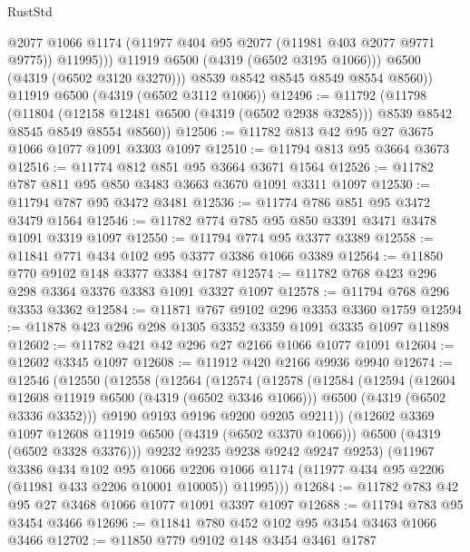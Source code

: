 \begin{lexlean}{RustStd}
\begin{coremodule}
                  @2077
                  @1066
                  @1174
                  (@11977 @404 @95 @2077 (@11981 @403 @2077 @9771 @9775))
                  @11995)))
            @11919
            @6500
            (@4319 (@6502 @3195 @1066)))
          @6500
          (@4319 (@6502 @3120 @3270)))
        @8539
        @8542
        @8545
        @8549
        @8554
        @8560))
    @11919
    @6500
    (@4319 (@6502 @3112 @1066))
@12496 := @11792
    (@11798
      (@11804
        (@12158 @12481 @6500 (@4319 (@6502 @2938 @3285)))
        @8539
        @8542
        @8545
        @8549
        @8554
        @8560))
@12506 := @11782 @813 @42 @95 @27 @3675 @1066 @1077 @1091 @3303 @1097
@12510 := @11794 @813 @95 @3664 @3673
@12516 := @11774 @812 @851 @95 @3664 @3671 @1564
@12526 := @11782 @787 @811 @95 @850 @3483 @3663 @3670 @1091 @3311 @1097
@12530 := @11794 @787 @95 @3472 @3481
@12536 := @11774 @786 @851 @95 @3472 @3479 @1564
@12546 := @11782 @774 @785 @95 @850 @3391 @3471 @3478 @1091 @3319 @1097
@12550 := @11794 @774 @95 @3377 @3389
@12558 := @11841 @771 @434 @102 @95 @3377 @3386 @1066 @3389
@12564 := @11850 @770 @9102 @148 @3377 @3384 @1787
@12574 := @11782 @768 @423 @296 @298 @3364 @3376 @3383 @1091 @3327 @1097
@12578 := @11794 @768 @296 @3353 @3362
@12584 := @11871 @767 @9102 @296 @3353 @3360 @1759
@12594 := @11878 @423 @296 @298 @1305 @3352 @3359 @1091 @3335 @1097 @11898
@12602 := @11782 @421 @42 @296 @27 @2166 @1066 @1077 @1091
@12604 := @12602 @3345 @1097
@12608 := @11912 @420 @2166 @9936 @9940
@12674 := @12546
    (@12550
      (@12558
        (@12564
          (@12574
            (@12578
              (@12584
                (@12594
                  (@12604 @12608 @11919 @6500 (@4319 (@6502 @3346 @1066)))
                  @6500
                  (@4319 (@6502 @3336 @3352)))
                @9190
                @9193
                @9196
                @9200
                @9205
                @9211))
            (@12602 @3369 @1097 @12608 @11919 @6500 (@4319 (@6502 @3370 @1066)))
            @6500
            (@4319 (@6502 @3328 @3376)))
          @9232
          @9235
          @9238
          @9242
          @9247
          @9253)
        (@11967
          @3386
          @434
          @102
          @95
          @1066
          @2206
          @1066
          @1174
          (@11977 @434 @95 @2206 (@11981 @433 @2206 @10001 @10005))
          @11995)))
@12684 := @11782 @783 @42 @95 @27 @3468 @1066 @1077 @1091 @3397 @1097
@12688 := @11794 @783 @95 @3454 @3466
@12696 := @11841 @780 @452 @102 @95 @3454 @3463 @1066 @3466
@12702 := @11850 @779 @9102 @148 @3454 @3461 @1787

\end{coremodule}
\end{lexlean}

